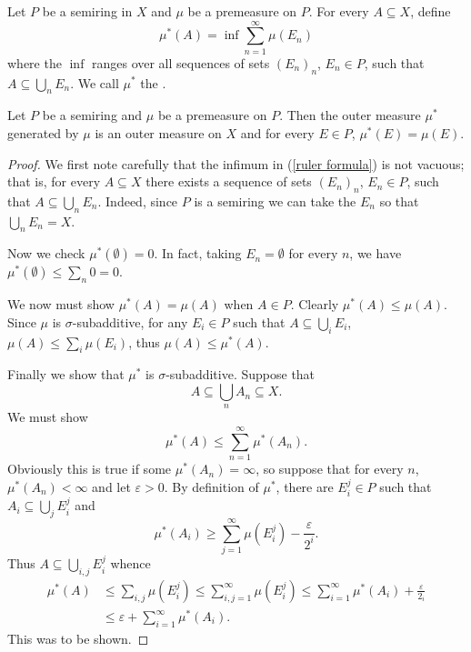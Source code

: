 \begin{definition}
Let $P$ be a semiring in $X$ and $\mu$ be a premeasure on $P$. For every $A \subseteq X$, define
\begin{equation}
\label{ruler formula}
\mu^{*}(A) = \inf \sum_{n=1}^{\infty} \mu(E_{n})
\end{equation}
where the $\inf$ ranges over all sequences of sets ${(E_{n})}_{n}$, $E_{n} \in P$, such that $A \subseteq \bigcup_{n} E_{n}$.
We call $\mu^{*}$ the .
\end{definition}

\begin{theorem}\label{extending premeasure to outer measure}
Let $P$ be a semiring and $\mu$ be a premeasure on $P$. Then the outer measure $\mu^{*}$ generated by $\mu$ is an outer measure on $X$ and for every $E \in P$, $\mu^{*}(E) = \mu(E)$.
\end{theorem}
\begin{proof}
We first note carefully that the infimum in (\ref{ruler formula}) is not vacuous; that is, for every $A \subseteq X$ there exists a sequence of sets ${(E_{n})}_{n}$, $E_{n} \in P$, such that $A \subseteq \bigcup_{n} E_{n}$.
Indeed, since $P$ is a semiring we can take the $E_{n}$ so that $\bigcup_{n} E_{n} = X$.

Now we check $\mu^{*}(\emptyset) = 0$. In fact, taking $E_{n} = \emptyset$ for every $n$, we have $\mu^{*}(\emptyset) \leq \sum_{n} 0 = 0$.

We now must show $\mu^{*}(A) = \mu(A)$ when $A \in P$. Clearly $\mu^{*}(A) \leq \mu(A)$.
Since $\mu$ is $\sigma$-subadditive, for any $E_{i} \in P$ such that $A \subseteq \bigcup_{i} E_{i}$, $\mu(A) \leq \sum_{i} \mu(E_{i})$, thus $\mu(A) \leq \mu^{*}(A)$.

Finally we show that $\mu^{*}$ is $\sigma$-subadditive. Suppose that
$$A \subseteq \bigcup_{n} A_{n} \subseteq X.$$
We must show
\[\mu^{*}(A) \leq \sum_{n=1}^{\infty} \mu^{*}(A_{n}).\]
Obviously this is true if some $\mu^{*}(A_{n}) = \infty$, so suppose that for every $n$, $\mu^{*}(A_{n}) < \infty$ and let $\varepsilon > 0$.
By definition of $\mu^{*}$, there are $E_{i}^{j} \in P$ such that $A_{i} \subseteq \bigcup_{j} E_{i}^{j}$
and
\[\mu^{*}(A_{i}) \geq \sum_{j=1}^{\infty} \mu(E_{i}^{j}) - \frac{\varepsilon}{2^{i}}.\]
Thus $A \subseteq \bigcup_{i,j}E_{i}^{j}$ whence
\begin{align*}\mu^{*}(A) &\leq \sum_{i,j} \mu(E_{i}^{j}) \leq \sum_{i,j=1}^{\infty} \mu(E_{i}^{j}) \leq \sum_{i=1}^{\infty} \mu^{*}(A_{i}) + \frac{\varepsilon}{2_{i}}\\& \leq \varepsilon + \sum_{i=1}^{\infty} \mu^{*}(A_{i}).\end{align*}
This was to be shown.
\end{proof}


